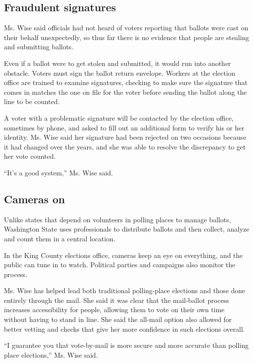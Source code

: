 \hypertarget{fraudulent-signatures}{%
\subsection{Fraudulent signatures}\label{fraudulent-signatures}}

Ms. Wise said officials had not heard of voters reporting that ballots
were cast on their behalf unexpectedly, so thus far there is no evidence
that people are stealing and submitting ballots.

Even if a ballot were to get stolen and submitted, it would run into
another obstacle. Voters must sign the ballot return envelope. Workers
at the election office are trained to examine signatures, checking to
make sure the signature that comes in matches the one on file for the
voter before sending the ballot along the line to be counted.

A voter with a problematic signature will be contacted by the election
office, sometimes by phone, and asked to fill out an additional form to
verify his or her identity. Ms. Wise said her signature had been
rejected on two occasions because it had changed over the years, and she
was able to resolve the discrepancy to get her vote counted.

``It's a good system,'' Ms. Wise said.

\hypertarget{cameras-on}{%
\subsection{Cameras on}\label{cameras-on}}

Unlike states that depend on volunteers in polling places to manage
ballots, Washington State uses professionals to distribute ballots and
then collect, analyze and count them in a central location.

In the King County elections office, cameras keep an eye on everything,
and the public can tune in to watch. Political parties and campaigns
also monitor the process.

Ms. Wise has helped lead both traditional polling-place elections and
those done entirely through the mail. She said it was clear that the
mail-ballot process increases accessibility for people, allowing them to
vote on their own time without having to stand in line. She said the
all-mail option also allowed for better vetting and checks that give her
more confidence in such elections overall.

``I guarantee you that vote-by-mail is more secure and more accurate
than polling place elections,'' Ms. Wise said.

